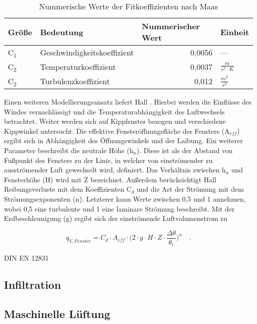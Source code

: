 \begin{table}[H] \centering
\begin{tabular}{|l|l|r|l|}
\hline
\rowcolor[HTML]{C0C0C0} 
Größe & Bedeutung & \multicolumn{1}{l|}{\cellcolor[HTML]{C0C0C0}Nummerischer Wert} & Einheit \\ \hline
C\(_1\) & Geschwindigkeitskoeffizient & 0,0056 & --- \\ \hline
\rowcolor[HTML]{EFEFEF} 
C\(_2\) & Temperaturkoeffizient & 0,0037 & \(\frac{m}{s^2 \cdot K}\) \\ \hline
C\(_2\) & Turbulenzkoeffizient & 0,012 & \(\frac{m^2}{s^2}\) \\ \hline
\end{tabular}
\label{tab: Tabelle3112}
\caption{Nummerische Werte der Fitkoeffizienten nach Maas \cite{Maas.1995}}
\end{table}

Einen weiteren Modellierungsansatz liefert Hall \cite{Hall.2004}.
Hierbei werden die Einflüsse des Windes vernachlässigt und die Temperaturabhängigkeit des Luftwechsels betrachtet.
Weiter werden sich auf Kippfenster bezogen und verschiedene Kippwinkel untersucht.
Die effektive Fensteröffnungsfläche des Fensters (A\(_{eff}\)) ergibt sich in Abhängigkeit des Öffnungswinkels und der Laibung.
Ein weiterer Parameter beschreibt die neutrale Höhe (h\(_n\)). 
Diese ist als der Abstand von Fußpunkt des Fensters zu der Linie, in welcher von einströmender zu ausströmender Luft gewechselt wird, definiert.
Das Verhältnis zwischen h\(_n\) und Fensterhöhe (H) wird mit Z bezeichnet.
Außerdem berücksichtigt Hall Reibungsverluste mit dem Koeffizienten C\(_d\) und die Art der Strömung mit dem Strömungsexponenten (n). 
Letzterer kann Werte zwischen 0,5 und 1 annehmen, wobei 0,5 eine turbulente und 1 eine laminare Strömung beschreibt.
Mit der Erdbeschleunigung (g) ergibt sich der einströmende Luftvolumenstrom zu 

\begin{equation}
\label{eq:Gleichung3112}
q_{V, Fenster} = C_d \cdot A_{eff} \cdot \Biggl( 2 \cdot g \cdot H \cdot Z \cdot \frac{\Delta\theta}{\theta_i}\Biggr)^n \quad \text{.}
\end{equation}

DIN EN 12831


\subsection{Infiltration}
\label{subsec:Sektion 312}


\subsection{Maschinelle Lüftung}
\label{subsec:Sektion 313}